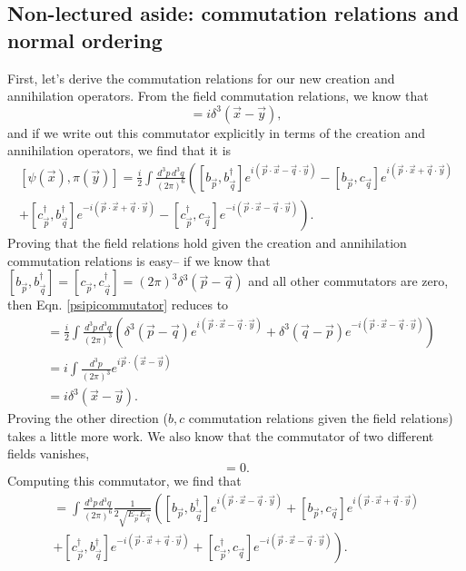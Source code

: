 \subsection*{Non-lectured aside: commutation relations and normal ordering}
First, let's derive the commutation relations for our new creation and annihilation operators. From the field commutation relations, we know that
\begin{equation*}
    [\psi(\vec x),\pi(\vec y)]=i\delta^3(\vec x-\vec y),
\end{equation*}
and if we write out this commutator explicitly in terms of the creation and annihilation operators, we find that it is
\begin{multline}\label{psipicommutator}
    [\psi(\vec x),\pi(\vec y)]=\frac{i}{2} \int \frac{d^3p\, d^3q}{(2\pi)^6} 
    \left([b_{\vec p}, b_{\vec q}^\dagger] e^{i(\vec p \cdot \vec x -\vec q \cdot \vec y)} - [b_{\vec p},c_{\vec q}] e^{i(\vec p \cdot \vec x + \vec q \cdot \vec y)}\right.\\
    \left.+[c_{\vec p}^\dagger, b_{\vec q}^\dagger] e^{-i(\vec p \cdot \vec x + \vec q \cdot \vec y)} - [c_{\vec p}^\dagger,c_{\vec q}] e^{-i(\vec p\cdot \vec x - \vec q \cdot \vec y)}\right).
\end{multline}
Proving that the field relations hold given the creation and annihilation commutation relations is easy-- if we know that $[b_{\vec p},b_{\vec q}^\dagger]=[c_{\vec p},c_{\vec q}^\dagger]=(2\pi)^3\delta^3(\vec p-\vec q)$ and all other commutators are zero, then Eqn. \ref{psipicommutator} reduces to
\begin{align*}
    [\psi(\vec x),\pi(\vec y)]&=\frac{i}{2} \int \frac{d^3p\, d^3q}{(2\pi)^3} 
    \left(\delta^3(\vec p-\vec q) e^{i(\vec p \cdot \vec x -\vec q \cdot \vec y)}
    +\delta^3(\vec q-\vec p) e^{-i(\vec p\cdot \vec x - \vec q \cdot \vec y)}\right)\\
    &=i \int\frac{d^3p}{(2\pi)^3} e^{i\vec p\cdot(\vec x -\vec y)}\\
    &=i \delta^3(\vec x- \vec y).
\end{align*}
Proving the other direction ($b,c$ commutation relations given the field relations) takes a little more work. We also know that the commutator of two different fields vanishes,
\begin{equation*}
    [\psi(\vec x),\psi^\dagger(\vec y)]=0.
\end{equation*}
Computing this commutator, we find that
\begin{multline}
    [\psi(\vec x),\psi^\dagger(\vec y)]=\int \frac{d^3p\,d^3q}{(2\pi)^6}\frac{1}{2\sqrt{E_{\vec p} E_{\vec q}}}
    \left([b_{\vec p}, b_{\vec q}^\dagger] e^{i(\vec p \cdot \vec x -\vec q \cdot \vec y)} + [b_{\vec p},c_{\vec q}] e^{i(\vec p \cdot \vec x + \vec q \cdot \vec y)}\right.\\
    \left.+ [c_{\vec p}^\dagger, b_{\vec q}^\dagger] e^{-i(\vec p \cdot \vec x + \vec q \cdot \vec y)} + [c_{\vec p}^\dagger,c_{\vec q}] e^{-i(\vec p\cdot \vec x - \vec q \cdot \vec y)}\right).
\end{multline}
